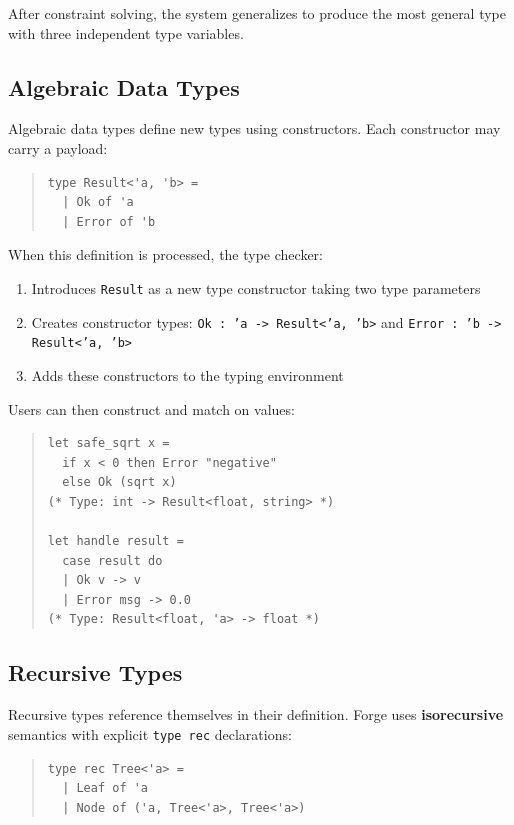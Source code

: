 \documentclass[conference,onecolumn]{IEEEtran}
\begin{document}
After constraint solving, the system generalizes to produce the most general type with three independent type variables.

\subsection{Algebraic Data Types}

Algebraic data types define new types using constructors. Each constructor may carry a payload:

\begin{quote}
\small
\begin{verbatim}
type Result<'a, 'b> = 
  | Ok of 'a
  | Error of 'b
\end{verbatim}
\end{quote}

When this definition is processed, the type checker:
\begin{enumerate}
\item Introduces \texttt{Result} as a new type constructor taking two type parameters
\item Creates constructor types: \texttt{Ok : 'a -> Result<'a, 'b>} and \texttt{Error : 'b -> Result<'a, 'b>}
\item Adds these constructors to the typing environment
\end{enumerate}

Users can then construct and match on values:

\begin{quote}
\small
\begin{verbatim}
let safe_sqrt x =
  if x < 0 then Error "negative"
  else Ok (sqrt x)
(* Type: int -> Result<float, string> *)

let handle result =
  case result do
  | Ok v -> v
  | Error msg -> 0.0
(* Type: Result<float, 'a> -> float *)
\end{verbatim}
\end{quote}

\subsection{Recursive Types}

Recursive types reference themselves in their definition. Forge uses \textbf{isorecursive} semantics with explicit \texttt{type rec} declarations:

\begin{quote}
\small
\begin{verbatim}
type rec Tree<'a> = 
  | Leaf of 'a
  | Node of ('a, Tree<'a>, Tree<'a>)
\end{verbatim}
\end{quote}
\end{document}
